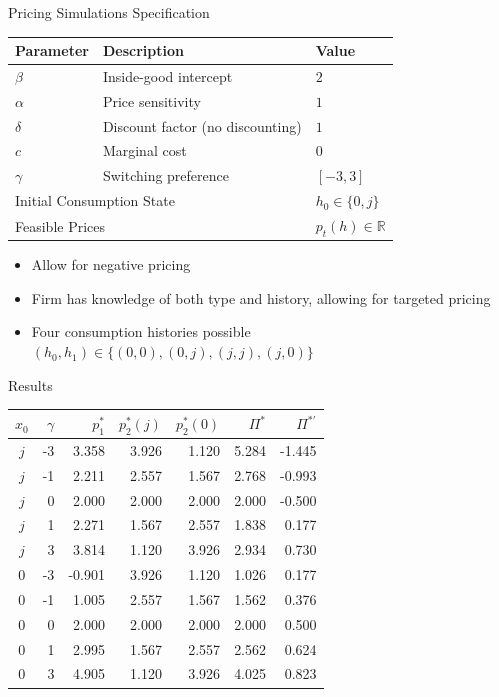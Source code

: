 \documentclass[aspectratio=169,professionalfonts]{beamer}
\newcommand{\shortbuttons}{}
\begin{document}
\gdef\shortbuttons{\hyperlink{short-14}{\beamergotobutton{Back to Optimal Prices}}}
\begin{frame}[label=short-12,noframenumbering]{Pricing Simulations Specification}
  \centering
  \small
  \begin{tabular}{lll}
    \toprule
    Parameter & Description & Value \\
    \midrule
    $\beta$ & Inside-good intercept & $2$ \\
    $\alpha$ & Price sensitivity & $1$ \\
    $\delta$ & Discount factor (no discounting) & $1$ \\
    $c$ & Marginal cost & $0$ \\
    $\gamma$ & Switching preference & $[-3,3]$ \\
    \midrule
    \multicolumn{2}{l}{Initial Consumption State}
      & $h_0\in\{0,j\}$ \\
    \multicolumn{2}{l}{Feasible Prices}
      & $p_t(h)\in\mathbb{R}$ \\
    \bottomrule
  \end{tabular}
  \begin{itemize}
    \item Allow for negative pricing
    \item Firm has knowledge of both type and history, allowing for targeted pricing
    \item Four consumption histories possible $(h_0, h_1) \in \{(0,0), (0,j), (j,j), (j,0)\}$
  \end{itemize}
\end{frame}


\gdef\shortbuttons{\hyperlink{short-14}{\beamergotobutton{Back to Optimal Prices}}}
\begin{frame}[label=short-13,noframenumbering]{Results}
  \begin{center}\small\begin{tabular}{crrrrrr}\toprule
  $x_0$ & $\gamma$ & $p_1^*$ & $p_2^*(j)$ & $p_2^*(0)$ & $\Pi^*$ & $\Pi^{*\prime}$\\\midrule
  $j$ & -3 & 3.358 & 3.926 & 1.120 & 5.284 & -1.445\\
  $j$ & -1 & 2.211 & 2.557 & 1.567 & 2.768 & -0.993\\
  $j$ & 0 & 2.000 & 2.000 & 2.000 & 2.000 & -0.500\\
  $j$ & 1 & 2.271 & 1.567 & 2.557 & 1.838 & 0.177\\
  $j$ & 3 & 3.814 & 1.120 & 3.926 & 2.934 & 0.730\\
  $0$ & -3 & -0.901 & 3.926 & 1.120 & 1.026 & 0.177\\
  $0$ & -1 & 1.005 & 2.557 & 1.567 & 1.562 & 0.376\\
  $0$ & 0 & 2.000 & 2.000 & 2.000 & 2.000 & 0.500\\
  $0$ & 1 & 2.995 & 1.567 & 2.557 & 2.562 & 0.624\\
  $0$ & 3 & 4.905 & 1.120 & 3.926 & 4.025 & 0.823\\
  \bottomrule\end{tabular}\end{center}
\end{frame}
\end{document}
